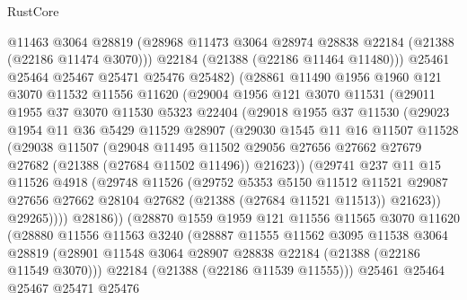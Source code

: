 \begin{lexlean}{RustCore}
\begin{coremodule}
          @11463
          @3064
          @28819
          (@28968 @11473 @3064 @28974 @28838 @22184 (@21388 (@22186 @11474 @3070)))
          @22184
          (@21388 (@22186 @11464 @11480)))
        @25461
        @25464
        @25467
        @25471
        @25476
        @25482)
      (@28861
        @11490
        @1956
        @1960
        @121
        @3070
        @11532
        @11556
        @11620
        (@29004
          @1956
          @121
          @3070
          @11531
          (@29011
            @1955
            @37
            @3070
            @11530
            @5323
            @22404
            (@29018
              @1955
              @37
              @11530
              (@29023
                @1954
                @11
                @36
                @5429
                @11529
                @28907
                (@29030
                  @1545
                  @11
                  @16
                  @11507
                  @11528
                  (@29038
                    @11507
                    (@29048
                      @11495
                      @11502
                      @29056
                      @27656
                      @27662
                      @27679
                      @27682
                      (@21388 (@27684 @11502 @11496))
                      @21623))
                  (@29741
                    @237
                    @11
                    @15
                    @11526
                    @4918
                    (@29748
                      @11526
                      (@29752
                        @5353
                        @5150
                        @11512
                        @11521
                        @29087
                        @27656
                        @27662
                        @28104
                        @27682
                        (@21388 (@27684 @11521 @11513))
                        @21623))
                    @29265))))
            @28186))
        (@28870
          @1559
          @1959
          @121
          @11556
          @11565
          @3070
          @11620
          (@28880
            @11556
            @11563
            @3240
            (@28887
              @11555
              @11562
              @3095
              @11538
              @3064
              @28819
              (@28901 @11548 @3064 @28907 @28838 @22184 (@21388 (@22186 @11549 @3070)))
              @22184
              (@21388 (@22186 @11539 @11555)))
            @25461
            @25464
            @25467
            @25471
            @25476

\end{coremodule}
\end{lexlean}

